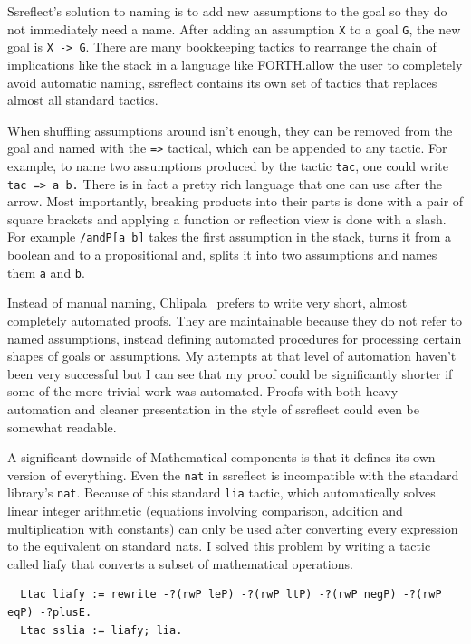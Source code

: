\documentclass[english, 12pt, a4paper, sci, a-1b, online]{aaltothesis}
\newcommand\icoq[1]{\texttt{#1}}
\begin{document}
Ssreflect's solution to naming is to add new assumptions to the goal so they do not immediately need a name. After adding an assumption \icoq{X} to a goal \icoq{G}, the new goal is \icoq{X -> G}. There are many bookkeeping tactics to rearrange the chain of implications like the stack in a language like FORTH.\@To allow the user to completely avoid automatic naming, ssreflect contains its own set of tactics that replaces almost all standard tactics.

When shuffling assumptions around isn't enough, they can be removed from the goal and named with the \icoq{=>} tactical, which can be appended to any tactic. For example, to name two assumptions produced by the tactic \icoq{tac}, one could write \icoq{tac => a b.} There is in fact a pretty rich language that one can use after the arrow. Most importantly, breaking products into their parts is done with a pair of square brackets and applying a function or reflection view is done with a slash. For example \icoq{/andP[a b]} takes the first assumption in the stack, turns it from a boolean and to a propositional and, splits it into two assumptions and names them \icoq{a} and \icoq{b}.

Instead of manual naming, Chlipala~\cite{CPDT} prefers to write very short, almost completely automated proofs. They are maintainable because they do not refer to named assumptions, instead defining automated procedures for processing certain shapes of goals or assumptions. My attempts at that level of automation haven't been very successful but I can see that my proof could be significantly shorter if some of the more trivial work was automated. Proofs with both heavy automation and cleaner presentation in the style of ssreflect could even be somewhat readable.

A significant downside of Mathematical components is that it defines its own version of everything. Even the \icoq{nat} in ssreflect is incompatible with the standard library's \icoq{nat}. Because of this standard \icoq{lia} tactic, which automatically solves linear integer arithmetic (equations involving comparison, addition and multiplication with constants) can only be used after converting every expression to the equivalent on standard nats. I solved this problem by writing a tactic called liafy that converts a subset of mathematical operations.

\begin{verbatim}
  Ltac liafy := rewrite -?(rwP leP) -?(rwP ltP) -?(rwP negP) -?(rwP eqP) -?plusE.
  Ltac sslia := liafy; lia.
\end{verbatim}
\end{document}
